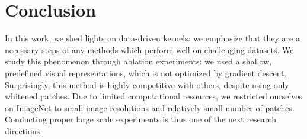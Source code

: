 \documentclass{article} %
\begin{document}
\section{Conclusion}
In this work, we shed lights on data-driven kernels: we emphasize that they are a necessary steps of any methods which perform well on challenging datasets. We study this phenomenon through ablation experiments: we used a shallow, predefined visual representations, which is not optimized by gradient descent. Surprisingly, this method is highly competitive with others, despite using only whitened patches. Due to limited computational resources, we restricted ourselves on ImageNet to small image resolutions and  relatively small number of patches. Conducting proper large scale experiments is thus one of the next research directions.



\end{document}
